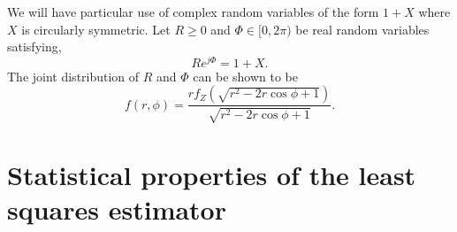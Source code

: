 \documentclass[conference]{IEEEtran}
\begin{document}
We will have particular use of complex random variables of the form $1 + X$ where $X$ is circularly symmetric.  Let $R \geq 0$ and $\Phi \in [0,2\pi)$ be real random variables satisfying, 
\[
R e^{j\Phi} = 1 + X.
\]
The joint distribution of $R$ and $\Phi$ can be shown to be
\[
f(r,\phi) = \frac{r f_Z(\sqrt{r^2 - 2r\cos\phi + 1})}{\sqrt{r^2 - 2r\cos\phi + 1}}.
\]






\section{Statistical properties of the least squares estimator}\label{sec:stat-prop-least}
\end{document}

